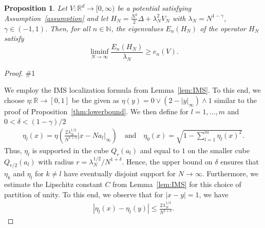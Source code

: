 \documentclass[12pt, reqno]{amsart}
\newtheorem{proposition}[theorem]{Proposition}
\theoremstyle{definition}
\numberwithin{equation}{section}
\newcommand{\R}{{\mathbb R}}
\newcommand{\N}{{\mathbb N}}
\newcommand{\lorenzorrection}[1]{\#1}%
\begin{document}
\begin{proposition}\label{prop:lower_bound_general_potentials}
    Let $V:\R^d\to [0,\infty)$ be a potential satisfying Assumption~\ref{assumption} and let $H_N=\frac{N^2}2\Delta + \lambda_N^2 V_N$ with $\lambda_N=N^{1-\gamma}$, $\gamma\in(-1,1)$. Then, for all  $n\in \N$,  the eigenvalues $E_{n}(H_N)$ of the operator $H_{N}$ satisfy
    $$\liminf_{N\to \infty}\frac{E_{n}(H_N)}{\lambda_N} \ge   e_n(V).$$ 
\end{proposition}
\begin{proof}
    \lorenzorrection{ As in the proof of  Proposition~\ref{thm:lowerbound}, the proof works again by induction on the energy level index $n\geq 0$. As above the base case $n=0$ can be obtained as a special case of the proof below without the inductive hypothesis. Suppose we have proved for all $m\leq n-1$ that\begin{equation*}
    E_m(H_N) \geq \lambda_Ne_{m}(V) + o(\lambda_N).
\end{equation*} We shall now prove that the statement holds true for $m=n$.} 

We employ the IMS localization formula from Lemma~\ref{lem:IMS}. 
    To this end, we choose 
      $ \eta :\R\to[0,1]$ be the given as $\eta(y) =0\vee(2-|y|_\infty )\wedge 1$ similar to the proof of Proposition~\ref{thm:lowerbound}. We then define for $l=1,\ldots,m$ and $0<\delta<(1-\gamma)/2$
    \begin{align*}
        \eta_l(x) = \eta\left(\frac{2\lambda_N^{1/2}}{N^{1+\delta}} |x - Na_l|_\infty \right)\quad\text{and}\quad
        \eta_0(x) = \sqrt{1-\sum_{l=1}^m \eta_l(x)^2}.
    \end{align*}
     Thus, $\eta_l$ is supported in the cube $Q_{r}(a_l)$ and equal to $1$ on the smaller cube $Q_{r/2}(a_l)$ with radius $r={\lambda_N^{1/2}}/{N^{1+\delta}} $.    
    Hence, the upper bound  on $\delta$ ensures that $\eta_k$ and $\eta_l$ for $k\neq l$ have eventually disjoint support for $N\to\infty$.
    Furthermore, we estimate the Lipschitz constant $C$ from Lemma~\ref{lem:IMS} for this choice of partition of unity. To this end, we observe that for $|x-y|=1$, we have
    \begin{align*}
        |\eta_l(x)-\eta_l(y)| %
        \leq \frac{2\lambda_N^{1/2}}{N^{1+\delta}}.
    \end{align*}


\end{proof}
\end{document}
